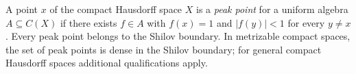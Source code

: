 
A point $x$ of the compact Hausdorff space $X$ is a \emph{peak point} for a uniform algebra $A\subseteq C(X)$ if there exists $f\in A$ with $f(x)=1$ and $|f(y)|<1$ for every $y\ne x$. Every peak point belongs to the Shilov boundary. In metrizable compact spaces, the set of peak points is dense in the Shilov boundary; for general compact Hausdorff spaces additional qualifications apply.
